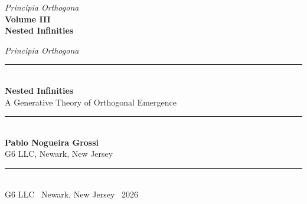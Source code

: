\documentclass[12pt, oneside]{book}
\theoremstyle{plain}
\theoremstyle{definition}
\theoremstyle{remark}
\begin{document}

\frontmatter

\thispagestyle{empty}
\vspace*{5cm}
\begin{center}
  {\large\itshape Principia Orthogona}\\[1em]
  {\LARGE\bfseries Volume III}\\[0.5em]
  {\Large\bfseries Nested Infinities}
\end{center}
\cleardoublepage

\thispagestyle{empty}
\begin{center}
\vspace*{1cm}
{\footnotesize\itshape Principia Orthogona}\\[0.3em]
{\rule{0.5\textwidth}{0.6pt}}\\[1.5em]
{\LARGE\bfseries Nested Infinities}\\[0.6em]
{\Large A Generative Theory of Orthogonal Emergence}\\[2em]
{\rule{0.5\textwidth}{0.3pt}}\\[2em]
{\large\bfseries Pablo Nogueira Grossi}\\[0.5em]
{\normalsize G6 LLC, Newark, New Jersey}\\[4em]
\vfill
{\rule{0.5\textwidth}{0.6pt}}\\[0.5em]
{\small G6 LLC \textperiodcentered\ Newark, New Jersey \textperiodcentered\ 2026}
\end{center}
\cleardoublepage
\end{document}
